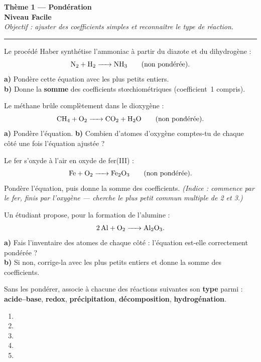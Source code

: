 \documentclass[11pt,a4paper]{article}
\begin{document}
\begin{center}
{\LARGE\bfseries\color{primarydark}Thème 1 — Pondération}\\[1pt]
{\large\color{excol}\textbf{Niveau Facile}}\\[2pt]
{\itshape Objectif : ajuster des coefficients simples et reconnaître le type de réaction.}\\
{\color{primary}\rule{0.6\linewidth}{1pt}}
\end{center}

\begin{exo}
Le procédé Haber synthétise l'ammoniac à partir du diazote et du dihydrogène :
\[ \ce{N2 + H2 -> NH3}\qquad\text{(non pondérée).} \]
\textbf{a)} Pondère cette équation avec les plus petits entiers.\\
\textbf{b)} Donne la \textbf{somme} des coefficients stœchiométriques (coefficient~1 compris).
\end{exo}

\begin{exo}
Le méthane brûle complètement dans le dioxygène :
\[ \ce{CH4 + O2 -> CO2 + H2O}\qquad\text{(non pondérée).} \]
\textbf{a)} Pondère l'équation.\quad
\textbf{b)} Combien d'atomes d'oxygène comptes-tu de chaque côté une fois l'équation ajustée ?
\end{exo}

\begin{exo}
Le fer s'oxyde à l'air en oxyde de fer(III) :
\[ \ce{Fe + O2 -> Fe2O3}\qquad\text{(non pondérée).} \]
Pondère l'équation, puis donne la somme des coefficients. \emph{(Indice : commence par le fer,
finis par l'oxygène — cherche le plus petit commun multiple de 2 et 3.)}
\end{exo}

\begin{exo}
Un étudiant propose, pour la formation de l'alumine :
\[ \ce{2 Al + O2 -> Al2O3}. \]
\textbf{a)} Fais l'inventaire des atomes de chaque côté : l'équation est-elle correctement pondérée ?\\
\textbf{b)} Si non, corrige-la avec les plus petits entiers et donne la somme des coefficients.
\end{exo}

\begin{exo}
Sans les pondérer, associe à chacune des réactions suivantes son \textbf{type} parmi :
\textbf{acide--base}, \textbf{redox}, \textbf{précipitation}, \textbf{décomposition}, \textbf{hydrogénation}.
\begin{enumerate}[label=\arabic*., leftmargin=1.8em,topsep=1pt,itemsep=1pt]
  \item {}
  \item {}
  \item {}
  \item {}
  \item {}
\end{enumerate}
\end{exo}
\end{document}
